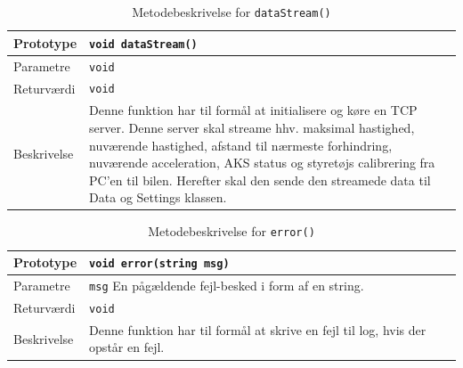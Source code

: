 \clearpage

\begin{table}[h]
\begin{tabularx}{\textwidth}{| L{2.5 cm} | Z |} \hline
Prototype 	& \texttt{void dataStream()} \\\hline
Parametre 	& \texttt{void}				\newline \\\hline
Returværdi	& \texttt{void} 			\newline \\\hline
Beskrivelse	& Denne funktion har til formål at initialisere og køre en TCP server. Denne server skal streame hhv. maksimal hastighed, nuværende hastighed, afstand til nærmeste forhindring, nuværende acceleration, AKS status og styretøjs calibrering fra PC'en til bilen. Herefter skal den sende den streamede data til Data og Settings klassen. \\\hline
\end{tabularx}
\caption{Metodebeskrivelse for \texttt{dataStream()}}
\label{table:met_datastream}
\end{table}

\begin{table}[h]
\begin{tabularx}{\textwidth}{| L{2.5 cm} | Z |} \hline
Prototype 	& \texttt{void error(string msg)} \\\hline
Parametre 	& \texttt{msg}				\newline En pågældende fejl-besked i form af en string. \\\hline
Returværdi	& \texttt{void} 			\newline \\\hline
Beskrivelse	& Denne funktion har til formål at skrive en fejl til log, hvis der opstår en fejl. \newline \\\hline
\end{tabularx}
\caption{Metodebeskrivelse for \texttt{error()}}
\label{table:met_error}
\end{table}